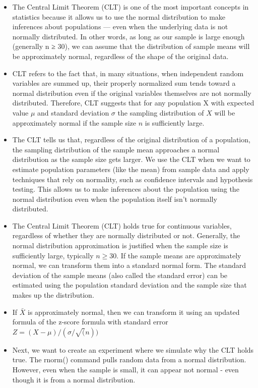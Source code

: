 \documentclass[
  letterpaper,
  DIV=11,
  numbers=noendperiod]{scrreprt}
\begin{document}
\begin{itemize}
\item
  The Central Limit Theorem (CLT) is one of the most important concepts
  in statistics because it allows us to use the normal distribution to
  make inferences about populations --- even when the underlying data is
  not normally distributed. In other words, as long as our sample is
  large enough (generally n ≥ 30), we can assume that the distribution
  of sample means will be approximately normal, regardless of the shape
  of the original data.
\item
  CLT refers to the fact that, in many situations, when independent
  random variables are summed up, their properly normalized sum tends
  toward a normal distribution even if the original variables themselves
  are not normally distributed. Therefore, CLT suggests that for any
  population X with expected value \(\mu\) and standard deviation
  \(\sigma\) the sampling distribution of \(X\) will be approximately
  normal if the sample size \(n\) is sufficiently large.
\item
  The CLT tells us that, regardless of the original distribution of a
  population, the sampling distribution of the sample mean approaches a
  normal distribution as the sample size gets larger. We use the CLT
  when we want to estimate population parameters (like the mean) from
  sample data and apply techniques that rely on normality, such as
  confidence intervals and hypothesis testing. This allows us to make
  inferences about the population using the normal distribution even
  when the population itself isn't normally distributed.
\item
  The Central Limit Theorem (CLT) holds true for continuous variables,
  regardless of whether they are normally distributed or not. Generally,
  the normal distribution approximation is justified when the sample
  size is sufficiently large, typically \(n≥30\). If the sample means
  are approximately normal, we can transform them into a standard normal
  form. The standard deviation of the sample means (also called the
  standard error) can be estimated using the population standard
  deviation and the sample size that makes up the distribution.
\item
  If \(\bar{X}\) is approximately normal, then we can transform it using
  an updated formula of the z-score formula with standard error
  \(𝑍=(𝑋- \mu)/(\sigma/\sqrt(n))\)
\item
  Next, we want to create an experiment where we simulate why the CLT
  holds true. The rnorm() command pulls random data from a normal
  distribution. However, even when the sample is small, it can appear
  not normal - even though it is from a normal distribution.
\end{itemize}
\end{document}
